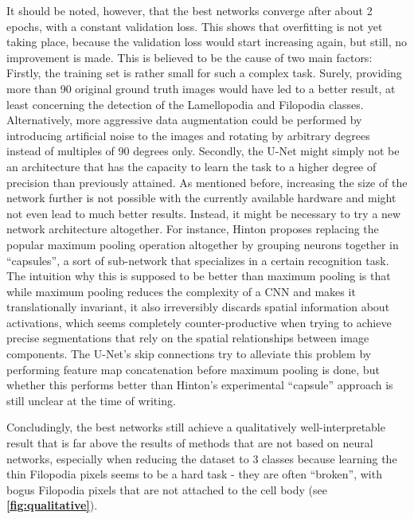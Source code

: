 It should be noted, however, that the best networks converge after about 2 epochs, with a constant validation loss. This shows that overfitting is not yet taking place, because the validation loss would start increasing again, but still, no improvement is made. This is believed to be the cause of two main factors: Firstly, the training set is rather small for such a complex task. Surely, providing more than 90 original ground truth images would have led to a better result, at least concerning the detection of the Lamellopodia and Filopodia classes. Alternatively, more aggressive data augmentation could be performed by introducing artificial noise to the images and rotating by arbitrary degrees instead of multiples of 90 degrees only. Secondly, the U-Net might simply not be an architecture that has the capacity to learn the task to a higher degree of precision than previously attained. As mentioned before, increasing the size of the network further is not possible with the currently available hardware and might not even lead to much better results. Instead, it might be necessary to try a new network architecture altogether. For instance, Hinton \cite{capsules} proposes replacing the popular maximum pooling operation altogether by grouping neurons together in ``capsules'', a sort of sub-network that specializes in a certain recognition task. The intuition why this is supposed to be better than maximum pooling is that while maximum pooling reduces the complexity of a CNN and makes it translationally invariant, it also irreversibly discards spatial information about activations, which seems completely counter-productive when trying to achieve precise segmentations that rely on the spatial relationships between image components. The U-Net's skip connections try to alleviate this problem by performing feature map concatenation before maximum pooling is done, but whether this performs better than Hinton's experimental ``capsule'' approach is still unclear at the time of writing.

Concludingly, the best networks still achieve a qualitatively well-interpretable result that is far above the results of methods that are not based on neural networks, especially when reducing the dataset to 3 classes because learning the thin Filopodia pixels seems to be a hard task - they are often ``broken'', with bogus Filopodia pixels that are not attached to the cell body (see \textbf{\ref{fig:qualitative}}).